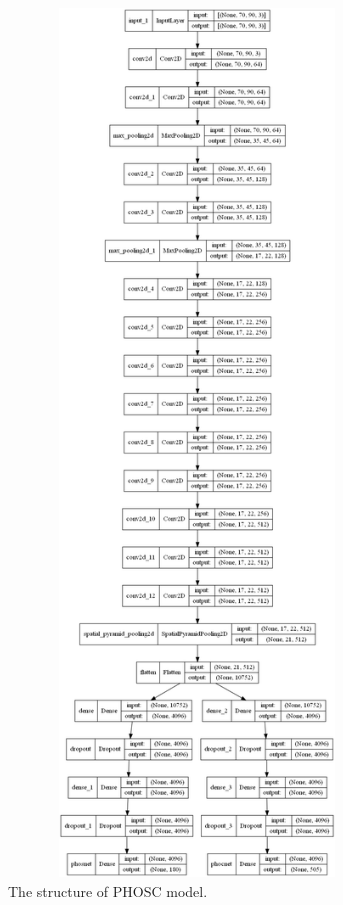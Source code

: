 \begin{itemize}[itemsep=1pt, topsep=5pt]
    \begin{figure}
        \centering
        \includegraphics[width=10cm, height=23cm]{images/layers.png}
        \caption{The structure of PHOSC model.}
        \label{fig:layers}
    \end{figure}
    
\end{itemize}

